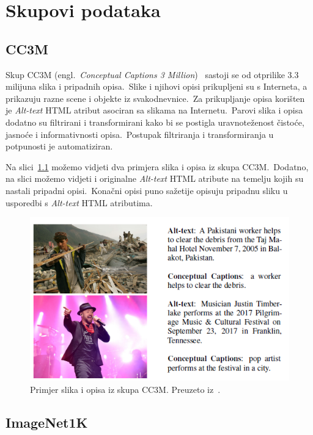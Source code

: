 \documentclass[times, utf8, seminar, numeric]{fer}
\begin{document}
\chapter{Skupovi podataka}

\section{CC3M}

Skup CC3M (engl.\ \textit{Conceptual Captions 3 Million})~\cite{sharma2018conceptual} sastoji se od otprilike 3.3 milijuna slika i pripadnih opisa.\ 
Slike i njihovi opisi prikupljeni su s Interneta, a prikazuju razne scene i objekte iz svakodnevnice.\ Za prikupljanje opisa korišten je \textit{Alt-text} HTML atribut asociran sa slikama na Internetu.\ 
Parovi slika i opisa dodatno su filtrirani i transformirani kako bi se postigla uravnoteženost čistoće, jasnoće i informativnosti opisa.\ Postupak filtriranja i transformiranja u potpunosti je automatiziran.\ 

Na slici~\ref{fig:CC3M} možemo vidjeti dva primjera slika i opisa iz skupa CC3M.\ Dodatno, na slici možemo vidjeti i originalne \textit{Alt-text} HTML atribute na temelju kojih su nastali pripadni opisi.\
Konačni opisi puno sažetije opisuju pripadnu sliku u usporedbi s \textit{Alt-text} HTML atributima.\

\begin{figure}[h]
    \centering
    \includegraphics[scale=0.7]{./Slike/CC3M.png}
    \caption{Primjer slika i opisa iz skupa CC3M. Preuzeto iz~\cite{sharma2018conceptual}.}
    \label{fig:CC3M}
\end{figure}

\section{ImageNet1K}
\end{document}
